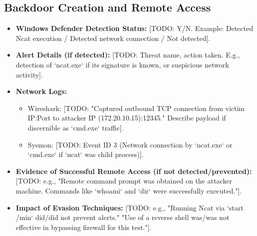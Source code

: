 \documentclass[11pt]{article}
\begin{document}
	\subsection{Backdoor Creation and Remote Access}
	\begin{itemize}
		\item \textbf{Windows Defender Detection Status:} [TODO: Y/N. Example: Detected Ncat execution / Detected network connection / Not detected].
		\item \textbf{Alert Details (if detected):} [TODO: Threat name, action taken. E.g., detection of `ncat.exe` if its signature is known, or suspicious network activity].
		\item \textbf{Network Logs:}
		\begin{itemize}
			\item Wireshark: [TODO: "Captured outbound TCP connection from victim IP:Port to attacker IP (172.20.10.15):12345." Describe payload if discernible as `cmd.exe` traffic].
			\item Sysmon: [TODO: Event ID 3 (Network connection by `ncat.exe` or `cmd.exe` if `ncat` was child process)].
		\end{itemize}
		\item \textbf{Evidence of Successful Remote Access (if not detected/prevented):} [TODO: e.g., "Remote command prompt was obtained on the attacker machine. Commands like `whoami` and `dir` were successfully executed."].
		\item \textbf{Impact of Evasion Techniques:} [TODO: e.g., "Running Ncat via `start /min` did/did not prevent alerts." "Use of a reverse shell was/was not effective in bypassing firewall for this test."].
	\end{itemize}
	
\end{document}
